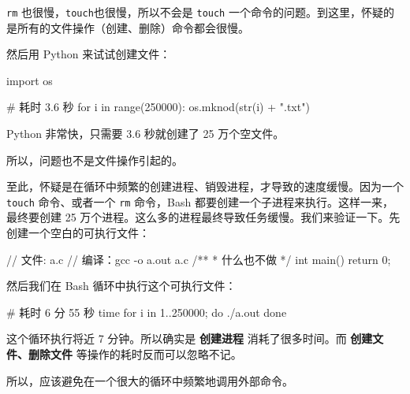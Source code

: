 \documentclass{mynote}
\begin{document}
\texttt{rm} 也很慢，\texttt{touch}也很慢，所以不会是 \texttt{touch} 一个命令的问题。到这里，怀疑的是所有的文件操作（创建、删除）命令都会很慢。

然后用 Python 来试试创建文件：

\begin{PythonCode}
import os

# 耗时 3.6 秒
for i in range(250000):
	os.mknod(str(i) + ".txt")
\end{PythonCode}

Python 非常快，只需要 3.6 秒就创建了 25 万个空文件。

所以，问题也不是文件操作引起的。

至此，怀疑是在循环中频繁的创建进程、销毁进程，才导致的速度缓慢。因为一个 \texttt{touch} 命令、或者一个 \texttt{rm} 命令，Bash 都要创建一个子进程来执行。这样一来，最终要创建 25 万个进程。这么多的进程最终导致任务缓慢。我们来验证一下。先创建一个空白的可执行文件：

\begin{CCode}
// 文件: a.c
// 编译：gcc -o a.out a.c
/**
 * 什么也不做
 */
int main()
{
	return 0;
}
\end{CCode}

然后我们在 Bash 循环中执行这个可执行文件：

\begin{BashCode}
# 耗时 6 分 55 秒
time for i in {1..250000}; do
	./a.out
done
\end{BashCode}

这个循环执行将近 7 分钟。所以确实是 \textbf{创建进程} 消耗了很多时间。而 \textbf{创建文件、删除文件} 等操作的耗时反而可以忽略不记。

所以，应该避免在一个很大的循环中频繁地调用外部命令。
\end{document}
